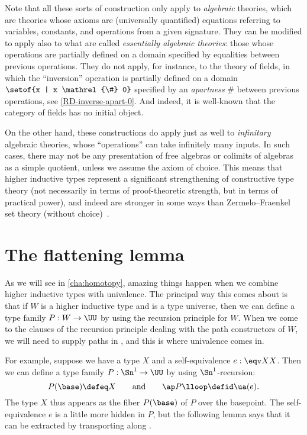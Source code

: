 \mentalpause

Note that all these sorts of construction only apply to \emph{algebraic} theories, which are theories whose axioms are (universally quantified) equations referring to variables, constants, and operations from a given signature.
They can be modified to apply also to what are called \emph{essentially algebraic theories}: those whose operations are partially defined on a domain specified by equalities between previous operations.
They do not apply, for instance, to the theory of fields, in which the ``inversion'' operation is partially defined on a domain $\setof{x | x \mathrel{\#} 0}$ specified by an \emph{apartness} $\#$ between previous operations, see \cref{RD-inverse-apart-0}.
And indeed, it is well-known that the category of fields has no initial object.
%

On the other hand, these constructions do apply just as well to \emph{infinitary} algebraic theories, whose ``operations'' can take infinitely many inputs.
In such cases, there may not be any presentation of free algebras or colimits of algebras as a simple quotient, unless we assume the axiom of choice.
This means that higher inductive types represent a significant strengthening of constructive type theory (not necessarily in terms of proof-theoretic strength, but in terms of practical power), and indeed are stronger in some ways than Zermelo--Fraenkel set theory (without choice)~\cite{blass:freealg}.


\section{The flattening lemma}
\label{sec:flattening}

As we will see in \cref{cha:homotopy}, amazing things happen when we combine higher inductive types with univalence.
The principal way this comes about is that if $W$ is a higher inductive type and \UU is a type universe, then we can define a type family $P:W\to \UU$ by using the recursion principle for $W$.
When we come to the clauses of the recursion principle dealing with the path constructors of $W$, we will need to supply paths in \UU, and this is where univalence comes in.

For example, suppose we have a type $X$ and a self-equivalence $e:\eqv X X$.
Then we can define a type family $P:\Sn^1 \to \UU$ by using $\Sn^1$-recursion:
\begin{equation*}
  P(\base) \defeq X
  \qquad\text{and}\qquad
  \ap P\lloop \defid \ua(e).
\end{equation*}
The type $X$ thus appears as the fiber $P(\base)$ of $P$ over the basepoint.
The self-equivalence $e$ is a little more hidden in $P$, but the following lemma says that it can be extracted by transporting along \lloop.

